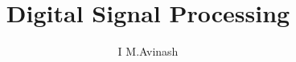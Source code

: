 \documentclass[journal,12pt,twocolumn]{IEEEtran}
\begin{document}
\let\StandardTheFigure\thefigure
\renewcommand{\thefigure}{\theproblem}



\def\putbox#1#2#3{\makebox[0in][l]{\makebox[#1][l]{}\raisebox{\baselineskip}[0in][0in]{\raisebox{#2}[0in][0in]{#3}}}}
     \def\rightbox#1{\makebox[0in][r]{#1}}
     \def\centbox#1{\makebox[0in]{#1}}
     \def\topbox#1{\raisebox{-\baselineskip}[0in][0in]{#1}}
     \def\midbox#1{\raisebox{-0.5\baselineskip}[0in][0in]{#1}}

\vspace{3cm}

\title{ 
Digital Signal Processing
}


%
%
%

\author{I M.Avinash%
}
% 
%
\end{document}
